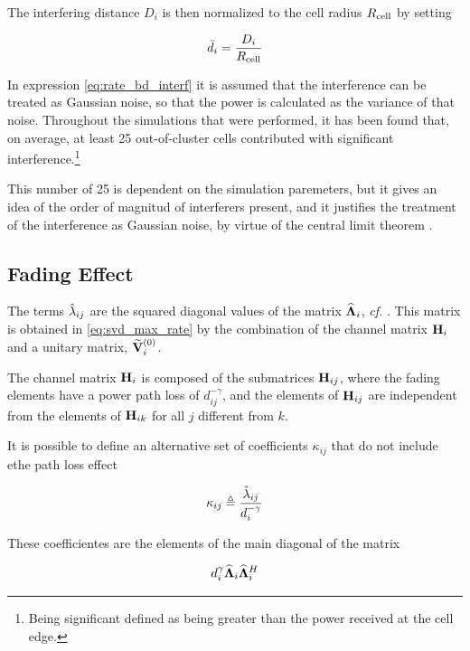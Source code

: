 The interfering distance $D_i$ is then normalized to the cell radius $R_{\text{cell}}$ by
setting

\begin{equation} \label{eq:interf_dist_norm}
    \bar{d}_i = \frac{D_i}{R_{\text{cell}}}
\end{equation}

In expression \eqref{eq:rate_bd_interf} it is assumed that the interference can
be treated as Gaussian noise, so that the power is calculated as the variance
of that noise. Throughout the simulations that were performed, it has been found
that, on average, at least 25 out-of-cluster cells contributed with significant
interference.\footnote{Being significant defined as being greater than the power
received at the cell edge.}

This number of 25 is dependent on the simulation paremeters, but it gives an
idea of the order of magnitud of interferers present, and it justifies the
treatment of the interference as Gaussian noise, by virtue of the central limit
theorem \cite{papoulis_fourier}.

\subsection{Fading Effect}\label{ssec:achiev_rate_fading}

The terms $\hat{\lambda}_{ij}$ are the squared diagonal values of the matrix
$\mathbf{\widehat{\Lambda}}_i$, \emph{cf.} . This matrix is obtained in
\eqref{eq:svd_max_rate} by the combination of the channel matrix $\mathbf{H}_i$ and a
unitary matrix, $\mathbf{\widetilde{V}}_i^{(0)}$.

The channel matrix $\mathbf{H}_i$ is composed of the submatrices $\mathbf{H}_{ij}$, where the
fading elements have a power path loss of $d_{ij}^{-\gamma}$, and the elements
of $\mathbf{H}_{ij}$ are independent from the elements of $\mathbf{H}_{ik}$ for all $j$
different from $k$.

It is possible to define an alternative set of coefficients $\kappa_{ij}$ that
do not include ethe path loss effect

\begin{equation} \label{eq:kappa_coeff}
    \kappa_{ij} \triangleq \frac{\hat{\lambda}_{ij}}{d_{i}^{-\gamma}}
\end{equation}

These coefficientes are the elements of the main diagonal of the matrix

\begin{equation} \label{eq:diag_matrix_no_path_loss}
    d_{i}^{\gamma}\mathbf{\widehat{\Lambda}}_i \mathbf{\widehat{\Lambda}}_i^H
\end{equation}

